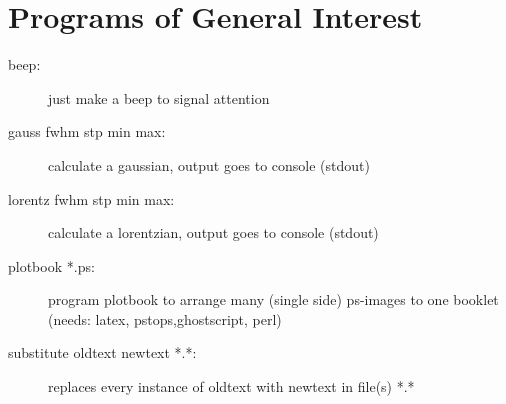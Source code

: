 \section{Programs of General Interest}

\begin{description}
\item [\prg beep:] just make a beep to signal attention 
\item [\prg gauss fwhm stp min max:] calculate a gaussian, output goes to console %
(stdout)
\item [\prg lorentz fwhm stp min max:] calculate a lorentzian, output goes to %
console (stdout)
\item [\prg plotbook *.ps:] program plotbook to arrange many (single side) ps-images to one %
booklet (needs: latex, pstops,ghostscript, perl)
\item [\prg substitute oldtext newtext *.*:] replaces every instance of %
oldtext with newtext in file(s) *.*
\end{description}


